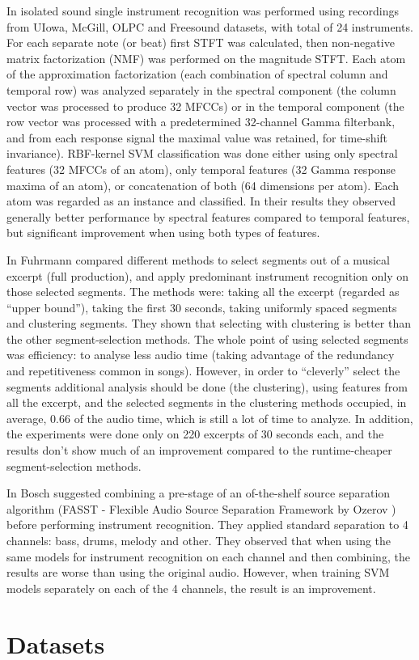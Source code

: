 \documentclass[journal]{IEEEtran}
\begin{document}
In \cite{tjoa2010musical} isolated sound single instrument recognition was performed using recordings from UIowa, McGill, OLPC and Freesound datasets, with total of 24 instruments.
For each separate note (or beat) first STFT was calculated, then non-negative matrix factorization (NMF) was performed on the magnitude STFT. Each atom of the approximation factorization (each combination of spectral column and temporal row) was analyzed separately in the spectral component (the column vector was processed to produce 32 MFCCs) or in the temporal component (the row vector was processed with a predetermined 32-channel Gamma filterbank, and from each response signal the maximal value was retained, for time-shift invariance). RBF-kernel SVM classification was done either using only spectral features (32 MFCCs of an atom), only temporal features (32 Gamma response maxima of an atom), or concatenation of both (64 dimensions per atom). Each atom was regarded as an instance and classified.
In their results they observed generally better performance by spectral features compared to temporal features, but significant improvement when using both types of features.

In \cite{fuhrmann2011quantifying} Fuhrmann \etal compared different methods to select segments out of a musical excerpt (full production), and apply predominant instrument recognition only on those selected segments. The methods were: taking all the excerpt (regarded as ``upper bound''), taking the first 30 seconds, taking uniformly spaced segments and clustering segments. They shown that selecting with clustering is better than the other segment-selection methods. The whole point of using selected segments was efficiency: to analyse less audio time (taking advantage of the redundancy and repetitiveness common in songs). However, in order to ``cleverly'' select the segments additional analysis should be done (the clustering), using features from all the excerpt, and the selected segments in the clustering methods occupied, in average, 0.66 of the audio time, which is still a lot of time to analyze. In addition, the experiments were done only on 220 excerpts of 30 seconds each, and the results don't show much of an improvement compared to the runtime-cheaper segment-selection methods.


In \cite{bosch2012comparison} Bosch \etal suggested combining a pre-stage of an of-the-shelf source separation algorithm (FASST - Flexible Audio Source Separation Framework by Ozerov \etal \cite{ozerov2012general}) before performing instrument recognition. They applied standard separation to 4 channels: bass, drums, melody and other. They observed that when using the same models for instrument recognition on each channel and then combining, the results are worse than using the original audio. However, when training SVM models separately on each of the 4 channels, the result is an improvement.

\section{Datasets}

\ifCLASSOPTIONcaptionsoff
  \newpage
\fi







\end{document}
